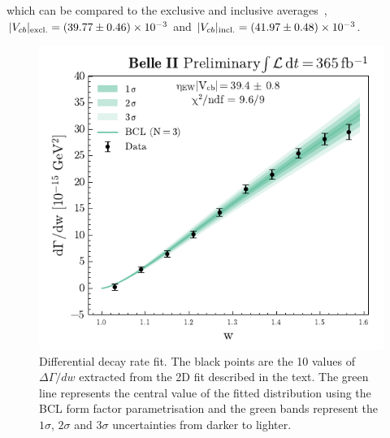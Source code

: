 \documentclass{moriond}
\def\vcb{V_{cb}}
\begin{document}
which can be compared to the exclusive and inclusive averages~\cite{hflav}, $|\vcb|_{\rm excl.} = (39.77 \pm 0.46) \times 10^{-3}$ and $|\vcb|_{\rm incl.} = (41.97 \pm 0.48) \times 10^{-3}$.
\begin{figure}[h!]
    \centering
    \includegraphics[scale=0.8]{bcl_fit.pdf}
    \caption{Differential decay rate fit. The black points are the 10 values of $\Delta\Gamma/dw$ extracted from the 2D fit described in the text. The green line represents the central value of the fitted distribution using the BCL form factor parametrisation and the green bands represent the $1\sigma$, $2\sigma$ and $3\sigma$ uncertainties from darker to lighter.}
    \label{fig:bcl_fit}
\end{figure}
\end{document}
